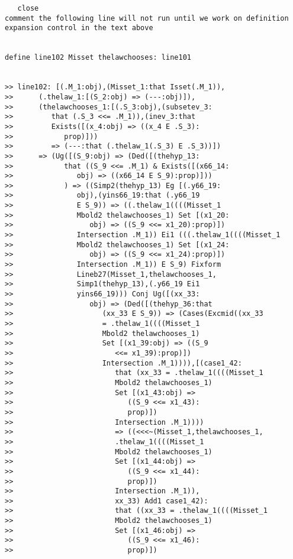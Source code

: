 \documentclass[12pt]{article}
\begin{document}
\begin{verbatim}
   close
comment the following line will not run until we work on definition expansion control in the text above


define line102 Misset thelawchooses: line101


>> line102: [(.M_1:obj),(Misset_1:that Isset(.M_1)),
>>      (.thelaw_1:[(S_2:obj) => (---:obj)]),
>>      (thelawchooses_1:[(.S_3:obj),(subsetev_3:
>>         that (.S_3 <<= .M_1)),(inev_3:that
>>         Exists([(x_4:obj) => ((x_4 E .S_3):
>>            prop)]))
>>         => (---:that (.thelaw_1(.S_3) E .S_3))])
>>      => (Ug([(S_9:obj) => (Ded([(thehyp_13:
>>            that ((S_9 <<= .M_1) & Exists([(x66_14:
>>               obj) => ((x66_14 E S_9):prop)]))
>>            ) => ((Simp2(thehyp_13) Eg [(.y66_19:
>>               obj),(yins66_19:that (.y66_19
>>               E S_9)) => ((.thelaw_1((((Misset_1
>>               Mbold2 thelawchooses_1) Set [(x1_20:
>>                  obj) => ((S_9 <<= x1_20):prop)])
>>               Intersection .M_1)) Ei1 (((.thelaw_1((((Misset_1
>>               Mbold2 thelawchooses_1) Set [(x1_24:
>>                  obj) => ((S_9 <<= x1_24):prop)])
>>               Intersection .M_1)) E S_9) Fixform
>>               Lineb27(Misset_1,thelawchooses_1,
>>               Simp1(thehyp_13),(.y66_19 Ei1
>>               yins66_19))) Conj Ug([(xx_33:
>>                  obj) => (Ded([(thehyp_36:that
>>                     (xx_33 E S_9)) => (Cases(Excmid((xx_33
>>                     = .thelaw_1((((Misset_1
>>                     Mbold2 thelawchooses_1)
>>                     Set [(x1_39:obj) => ((S_9
>>                        <<= x1_39):prop)])
>>                     Intersection .M_1)))),[(case1_42:
>>                        that (xx_33 = .thelaw_1((((Misset_1
>>                        Mbold2 thelawchooses_1)
>>                        Set [(x1_43:obj) =>
>>                           ((S_9 <<= x1_43):
>>                           prop)])
>>                        Intersection .M_1))))
>>                        => ((<<<~(Misset_1,thelawchooses_1,
>>                        .thelaw_1((((Misset_1
>>                        Mbold2 thelawchooses_1)
>>                        Set [(x1_44:obj) =>
>>                           ((S_9 <<= x1_44):
>>                           prop)])
>>                        Intersection .M_1)),
>>                        xx_33) Add1 case1_42):
>>                        that ((xx_33 = .thelaw_1((((Misset_1
>>                        Mbold2 thelawchooses_1)
>>                        Set [(x1_46:obj) =>
>>                           ((S_9 <<= x1_46):
>>                           prop)])

\end{verbatim}
\end{document}
